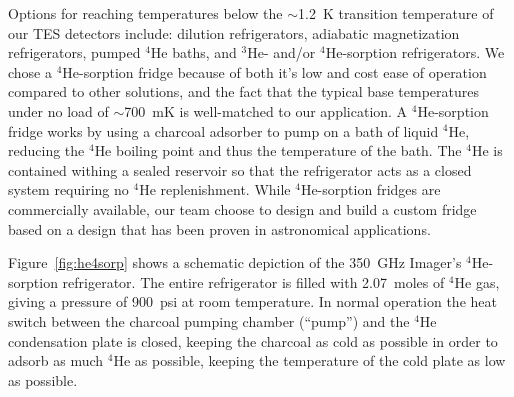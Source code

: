 \documentclass[10pt,twocolumn,article]{memoir}
\newcommand*{\figref}[1]{Figure~\ref{#1}}
\newcommand*{\TES}{{\small TES}\xspace}
\newcommand*{\He}[1]{$^{#1}$He\xspace}
\begin{document}
Options for reaching temperatures below the $\sim$1.2~K transition temperature of our \TES detectors include: dilution refrigerators, adiabatic magnetization refrigerators, pumped \He4 baths, and \He3- and/or \He4-sorption refrigerators.
We chose a \He4-sorption fridge because of both it's low and cost ease of operation compared to other solutions, and the fact that the typical base temperatures under no load of $\sim$700~mK is well-matched to our application.
A  \He4-sorption fridge works by using a charcoal adsorber to pump on a bath of liquid \He4, reducing the \He4 boiling point and thus the temperature of the bath.
The \He4 is contained withing a sealed reservoir so that the refrigerator acts as a closed system requiring no \He4 replenishment. 
While \He4-sorption fridges are commercially available, our team choose to design and build a custom fridge based on a design that has been proven in astronomical applications\cite{devlin2004high}.

\figref{fig:he4sorp} shows a schematic depiction of the 350~GHz Imager's \He4-sorption refrigerator.
The entire refrigerator is filled with 2.07~moles of \He4 gas, giving a pressure of 900~psi at room temperature.
In normal operation the heat switch between the charcoal pumping chamber (``pump'') and the \He4 condensation plate is closed, keeping the charcoal as cold as possible in order to adsorb as much \He4 as possible, keeping the temperature of the cold plate as low as possible.
\end{document}
